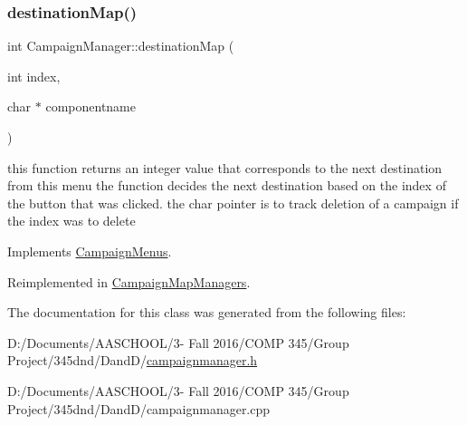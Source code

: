 \subsubsection{\texorpdfstring{destination\+Map()}{destinationMap()}}
{\footnotesize\ttfamily int Campaign\+Manager\+::destination\+Map (\begin{DoxyParamCaption}\item[{int}]{index,  }\item[{char $\ast$}]{componentname }\end{DoxyParamCaption})\hspace{0.3cm}{\ttfamily [virtual]}}

this function returns an integer value that corresponds to the next destination from this menu the function decides the next destination based on the index of the button that was clicked. the char pointer is to track deletion of a campaign if the index was to delete 

Implements \hyperlink{class_campaign_menus}{Campaign\+Menus}.



Reimplemented in \hyperlink{class_campaign_map_managers_a7136317d7a94280b0a0b2a3f69b18182}{Campaign\+Map\+Managers}.



The documentation for this class was generated from the following files\+:\begin{DoxyCompactItemize}
\item 
D\+:/\+Documents/\+A\+A\+S\+C\+H\+O\+O\+L/3-\/ Fall 2016/\+C\+O\+M\+P 345/\+Group Project/345dnd/\+Dand\+D/\hyperlink{campaignmanager_8h}{campaignmanager.\+h}\item 
D\+:/\+Documents/\+A\+A\+S\+C\+H\+O\+O\+L/3-\/ Fall 2016/\+C\+O\+M\+P 345/\+Group Project/345dnd/\+Dand\+D/campaignmanager.\+cpp\end{DoxyCompactItemize}
